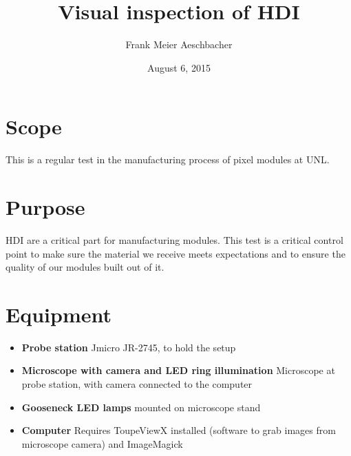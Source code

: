 \documentclass[12pt]{unlsilabsop}
\title{Visual inspection of HDI}
\date{August 6, 2015}
\author{Frank Meier Aeschbacher}
\begin{document}
\maketitle

\section{Scope}
This is a regular test in the manufacturing process of pixel modules at UNL.

\section{Purpose}
HDI are a critical part for manufacturing modules. This test is a critical control point to make sure the material we receive meets expectations and to ensure the quality of our modules built out of it.



\section{Equipment}

\begin{itemize}
\item \textbf{Probe station} Jmicro JR-2745, to hold the setup
\item \textbf{Microscope with camera and LED ring illumination} Microscope at probe station, with camera connected to the computer
\item \textbf{Gooseneck LED lamps} mounted on microscope stand
\item \textbf{Computer} Requires ToupeViewX installed (software to grab images from microscope camera) and ImageMagick
\end{itemize}
\end{document}
